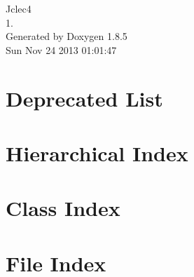 \documentclass[twoside]{book}
\newcommand{\clearemptydoublepage}{%
  \newpage{\pagestyle{empty}\cleardoublepage}%
}
\begin{document}
\hypersetup{pageanchor=false}
\begin{titlepage}
\vspace*{7cm}
\begin{center}%
{\Large Jclec4 \\[1ex]\large 1. }\\
\vspace*{1cm}
{\large Generated by Doxygen 1.8.5}\\
\vspace*{0.5cm}
{\small Sun Nov 24 2013 01:01:47}\\
\end{center}
\end{titlepage}
\clearemptydoublepage
\tableofcontents
\clearemptydoublepage
{}
\hypersetup{pageanchor=true}

\chapter{Deprecated List}
\label{deprecated}
\hypertarget{deprecated}{}

\chapter{Hierarchical Index}

\chapter{Class Index}

\chapter{File Index}

\end{document}
